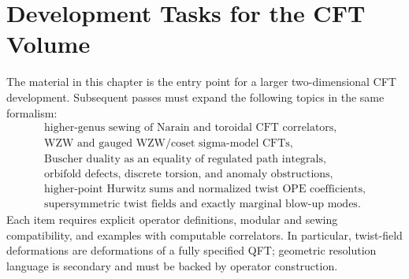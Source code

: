 \section{Development Tasks for the CFT Volume}

The material in this chapter is the entry point for a larger two-dimensional
CFT development.  Subsequent passes must expand the following topics in the
same formalism:
\[
\begin{gathered}
  \text{higher-genus sewing of Narain and toroidal CFT correlators},\\
  \text{WZW and gauged WZW/coset sigma-model CFTs},\\
  \text{Buscher duality as an equality of regulated path integrals},\\
  \text{orbifold defects, discrete torsion, and anomaly obstructions},\\
  \text{higher-point Hurwitz sums and normalized twist OPE coefficients},\\
  \text{supersymmetric twist fields and exactly marginal blow-up modes}.
\end{gathered}
\]
Each item requires explicit operator definitions, modular and sewing
compatibility, and examples with computable correlators.  In particular,
twist-field deformations are deformations of a fully specified QFT; geometric
resolution language is secondary and must be backed by operator
construction.
